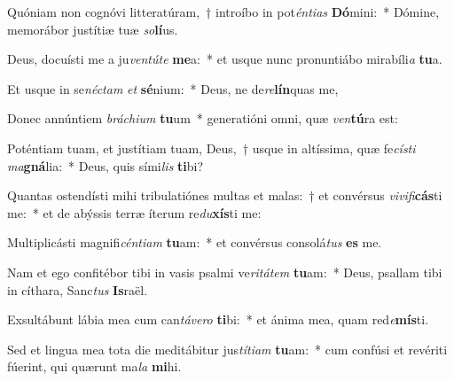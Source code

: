 \item Quóniam non cognóvi litteratúram,~† introíbo in pot\textit{én}\textit{ti}\textit{as} \textbf{Dó}mini:~* Dómine, memorábor justítiæ tuæ \textit{so}\textbf{lí}us.
\item Deus, docuísti me a ju\textit{ven}\textit{tú}\textit{te} \textbf{me}a:~* et usque nunc pronuntiábo mirabíli\textit{a} \textbf{tu}a.
\item Et usque in se\textit{néc}\textit{tam} \textit{et} \textbf{sé}nium:~* Deus, ne de\textit{re}\textbf{lín}quas me,
\item Donec annúntiem \textit{brá}\textit{chi}\textit{um} \textbf{tu}um~* generatióni omni, quæ \textit{ven}\textbf{tú}ra est:
\item Poténtiam tuam, et justítiam tuam, Deus,~† usque in altíssima, quæ fe\textit{cís}\textit{ti} \textit{ma}\textbf{gná}lia:~* Deus, quis sími\textit{lis} \textbf{ti}bi?
\item Quantas ostendísti mihi tribulatiónes multas et malas:~† et convérsus \textit{vi}\textit{vi}\textit{fi}\textbf{cás}ti me:~* et de abýssis terræ íterum re\textit{du}\textbf{xís}ti me:
\item Multiplicásti magnifi\textit{cén}\textit{ti}\textit{am} \textbf{tu}am:~* et convérsus consolá\textit{tus} \textbf{es} me.
\item Nam et ego confitébor tibi in vasis psalmi ve\textit{ri}\textit{tá}\textit{tem} \textbf{tu}am:~* Deus, psallam tibi in cíthara, Sanc\textit{tus} \textbf{Is}raël.
\item Exsultábunt lábia mea cum can\textit{tá}\textit{ve}\textit{ro} \textbf{ti}bi:~* et ánima mea, quam red\textit{e}\textbf{mís}ti.
\item Sed et lingua mea tota die meditábitur jus\textit{tí}\textit{ti}\textit{am} \textbf{tu}am:~* cum confúsi et revériti fúerint, qui quærunt ma\textit{la} \textbf{mi}hi.

